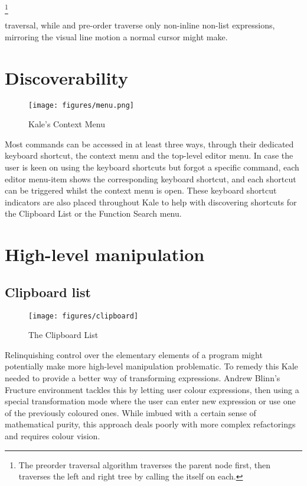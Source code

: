 \documentclass[11pt]{report}
\begin{document}
\footnote{The preorder traversal algorithm traverses the parent node first,
then traverses the left and right tree by calling the itself on each.}

traversal, while \ak{^} and 
pre-order traverse only non-inline non-list expressions, mirroring the visual
line motion a normal cursor might make.

\section{Discoverability}
\setlength\intextsep{0pt}
\begin{wrapfigure}[21]{R}{5.5cm}
\texttt{[image: figures/menu.png]}
\caption{Kale's Context Menu}
\end{wrapfigure}
Most commands can be accessed in at least three ways, through their dedicated
keyboard shortcut, the context menu and the top-level editor menu. In case the
user is keen on using the keyboard shortcuts but forgot a specific command,
each editor menu-item shows the corresponding keyboard shortcut, and each
shortcut can be triggered whilst the context menu is open. These keyboard
shortcut indicators are also placed throughout Kale to help with discovering
shortcuts for the Clipboard List or the Function Search menu.


\section{High-level manipulation}



\subsection{Clipboard list}
\begin{wrapfigure}[11]{R}{0.pt}
	\texttt{[image: figures/clipboard]}
	\caption{The Clipboard List}
\end{wrapfigure}

Relinquishing control over the elementary elements of a program might
potentially make more high-level manipulation problematic. To remedy this
Kale needed to provide a better way of transforming expressions. Andrew Blinn's
Fructure \cite{Fructure} environment tackles this by letting user colour
expressions, then
using a special transformation mode where the user can enter new expression or
use one of the previously coloured ones. While imbued with a certain sense of
mathematical purity, this approach deals poorly with more complex refactorings
and requires colour vision.
\end{document}
